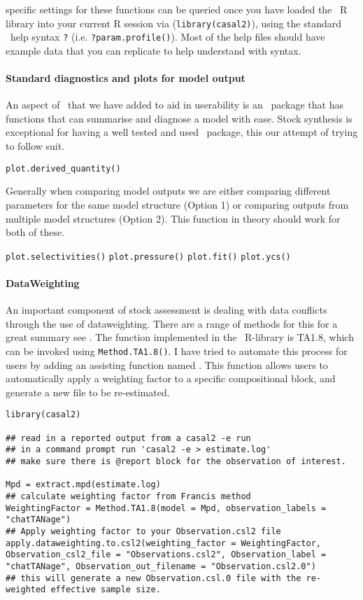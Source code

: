 specific settings for these functions can be queried once you have loaded the \CNAME\ R library into your current R session via (\texttt{library(casal2)}), using the standard \R\ help syntax \texttt{?} (i.e. \texttt{?param.profile()}). Most of the help files should have example data that you can replicate to help understand with syntax.
\\
\paragraph*{Standard diagnostics and plots for model output}
An aspect of \CNAME\ that we have added to aid in userability is an \R\ package that has functions that can summarise and diagnose a model with ease. Stock synthesis is exceptional for having a well tested and used \R\ package, this our attempt of trying to follow suit.

\texttt{plot.derived\_quantity()}


Generally when comparing model outputs we are either comparing different parameters for the same model structure (Option 1) or comparing outputs from multiple model structures (Option 2). This function in theory should work for both of these.

\texttt{plot.selectivities()}
\texttt{plot.pressure()}
\texttt{plot.fit()}
\texttt{plot.ycs()}

\paragraph*{DataWeighting}
An important component of stock assessment is dealing with data conflicts through the use of dataweighting. There are a range of methods for this for a great summary see \cite{francis2011data}. The function implemented in the \CNAME\ R-library is TA1.8, which can be invoked using \texttt{Method.TA1.8()}. I have tried to automate this process for users by adding an assisting function named . This function allows users to automatically apply a weighting factor to a specific compositional  block, and generate a new  file to be re-estimated.

\begin{lstlisting}
library(casal2)

## read in a reported output from a casal2 -e run
## in a command prompt run 'casal2 -e > estimate.log'
## make sure there is @report block for the observation of interest.

Mpd = extract.mpd(estimate.log)
## calculate weighting factor from Francis method
WeightingFactor = Method.TA1.8(model = Mpd, observation_labels = "chatTANage")
## Apply weighting factor to your Observation.csl2 file
apply.dataweighting.to.csl2(weighting_factor = WeightingFactor, Observation_csl2_file = "Observations.csl2", Observation_label = "chatTANage", Observation_out_filename = "Observation.csl2.0")
## this will generate a new Observation.csl.0 file with the re-weighted effective sample size.
\end{lstlisting}
